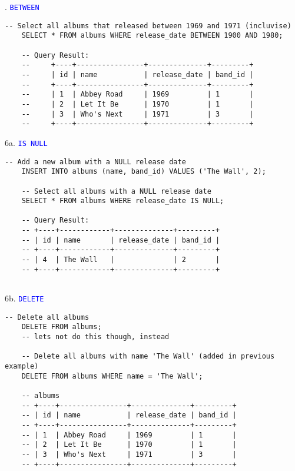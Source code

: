 . \textcolor{blue}{\texttt{BETWEEN}}
\begin{lstlisting}[style=sql]
    -- Select all albums that released between 1969 and 1971 (incluvise)
    SELECT * FROM albums WHERE release_date BETWEEN 1900 AND 1980;

    -- Query Result:
    --     +----+----------------+--------------+---------+
    --     | id | name           | release_date | band_id |
    --     +----+----------------+--------------+---------+
    --     | 1  | Abbey Road     | 1969         | 1       |
    --     | 2  | Let It Be      | 1970         | 1       |
    --     | 3  | Who's Next     | 1971         | 3       |
    --     +----+----------------+--------------+---------+

\end{lstlisting}

\noindent
6a. \textcolor{blue}{\texttt{IS NULL}}

\begin{lstlisting}[style=sql]
    -- Add a new album with a NULL release date
    INSERT INTO albums (name, band_id) VALUES ('The Wall', 2);

    -- Select all albums with a NULL release date
    SELECT * FROM albums WHERE release_date IS NULL;

    -- Query Result:
    -- +----+------------+--------------+---------+
    -- | id | name       | release_date | band_id |
    -- +----+------------+--------------+---------+
    -- | 4  | The Wall   |              | 2       |
    -- +----+------------+--------------+---------+
    
\end{lstlisting}

\noindent
6b. \textcolor{blue}{\texttt{DELETE}}

\begin{lstlisting}[style=sql]
    -- Delete all albums
    DELETE FROM albums;
    -- lets not do this though, instead

    -- Delete all albums with name 'The Wall' (added in previous example)
    DELETE FROM albums WHERE name = 'The Wall';

    -- albums
    -- +----+----------------+--------------+---------+
    -- | id | name           | release_date | band_id |
    -- +----+----------------+--------------+---------+
    -- | 1  | Abbey Road     | 1969         | 1       |
    -- | 2  | Let It Be      | 1970         | 1       |
    -- | 3  | Who's Next     | 1971         | 3       |
    -- +----+----------------+--------------+---------+

\end{lstlisting}